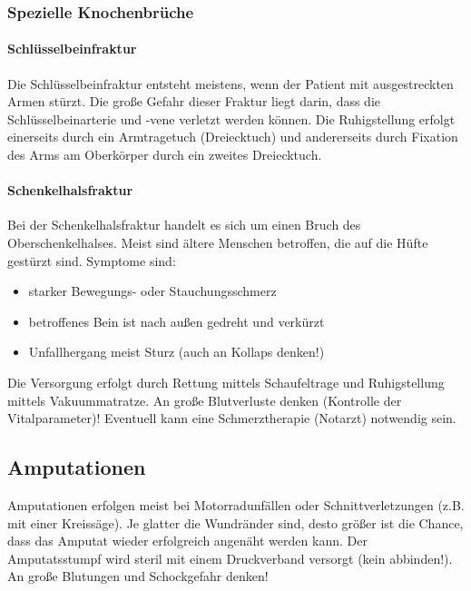 \subsubsection{Spezielle Knochenbrüche}

\paragraph{Schlüsselbeinfraktur} Die Schlüsselbeinfraktur entsteht meistens, wenn der Patient mit ausgestreckten Armen stürzt. Die große Gefahr dieser Fraktur liegt darin, dass die Schlüsselbeinarterie und -vene verletzt werden können. Die Ruhigstellung erfolgt einerseits durch ein Armtragetuch (Dreiecktuch) und andererseits durch Fixation des Arms am Oberkörper durch ein zweites Dreiecktuch.

\paragraph{Schenkelhalsfraktur} Bei der Schenkelhalsfraktur handelt es sich um einen Bruch des Oberschenkelhalses. Meist sind ältere Menschen betroffen, die auf die Hüfte gestürzt sind. Symptome sind:
\begin{itemize}
	\item starker Bewegungs- oder Stauchungsschmerz
	\item betroffenes Bein ist nach außen gedreht und verkürzt
	\item Unfallhergang meist Sturz (auch an Kollaps denken!)
\end{itemize}
Die Versorgung erfolgt durch Rettung mittels Schaufeltrage und Ruhigstellung mittels Vakuummatratze. An große Blutverluste denken (Kontrolle der Vitalparameter)! Eventuell kann eine Schmerztherapie (Notarzt) notwendig sein.

\subsection{Amputationen}


Amputationen erfolgen meist bei Motorradunfällen oder Schnittverletzungen (z.B. mit einer Kreissäge). Je glatter die Wundränder sind, desto größer ist die Chance, dass das Amputat wieder erfolgreich angenäht werden kann. Der Amputatsstumpf wird steril mit einem Druckverband versorgt (kein abbinden!). An große Blutungen und Schockgefahr denken!

